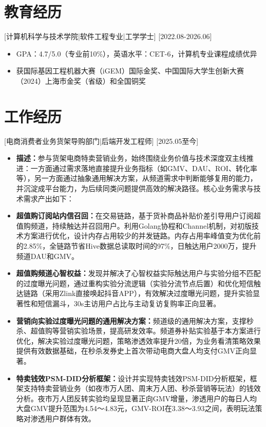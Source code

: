 \documentclass{style/template}
\begin{document}

\ResumeTitle

\section{教育经历}

[\textnormal{计算机科学与技术学院|软件工程专业|}工学学士]
[2022.08-2026.06]
\begin{itemize}
    \item GPA：4.7/5.0（专业前10\%），英语水平：CET-6，计算机专业课程成绩优异
    \item 获国际基因工程机器大赛（iGEM）国际金奖、中国国际大学生创新大赛（2024）上海市金奖（省级）和全国铜奖
\end{itemize}

\section{工作经历}

[\textnormal{电商消费者业务货架导购部门|}后端开发工程师]
[2025.05至今]
\begin{itemize}
    \item \textbf{描述：}参与货架电商特卖营销业务，始终围绕业务价值与技术深度双主线推进：一方面通过需求落地直接提升业务指标（如GMV、DAU、ROI、转化率等），另一方面通过抽象通用解决方案，从频道需求中判断能够复用的能力，并沉淀成平台能力，为后续同类问题提供高效的解决路径。核心业务需求与技术需求产出如下：
    \item \textbf{超值购订阅站内信召回：}在交易链路，基于货补商品补贴价差引导用户订阅超值购频道，持续触达并召回用户。利用Golang协程和Channel机制，对初版技术方案进行优化，设计内存占用较少的并发链路。内存占用率峰值变为优化前的2.85\%，全链路节省Hive数据总读取时间的97\%，日触达用户2000万，提升频道DAU和GMV。
    \item \textbf{超值购频道心智权益：}发现并解决了心智权益实际触达用户与实验分组不匹配的过度曝光问题，通过重构实验分流逻辑（实验分流节点后置）和优化短信触达链路（采用Zlink直接唤起抖音APP），有效解决过度曝光问题，提升实验显著性和短信漏斗，30s主访用户占比与主动复访复购率正向显著。
    \item \textbf{营销向实验过度曝光问题的通用解决方案：}频道级的通用解决方案，支撑秒杀、超值购等营销实验场景，提高研发效率。频道券补贴实验基于本方案进行优化，解决实验过度曝光问题，策略渗透效率提升20倍，为业务看清策略效果提供有效数据基础，在秒杀发券史上首次带动电商大盘人均支付GMV正向显著。
    \item \textbf{特卖钱效PSM-DID分析框架：}设计并实现特卖钱效PSM-DID分析框架，框架支持特卖营销业务（如夜市万人团、周末万人团、秒杀营销等玩法）的钱效分析。夜市万人团反转实验均呈现显著正向GMV增量，渗透用户的每日人均大盘GMV提升范围为4.54～4.83元，GMV-ROI在3.38～3.93之间，表明玩法策略对渗透用户群体有效。
\end{itemize}
\end{document}
